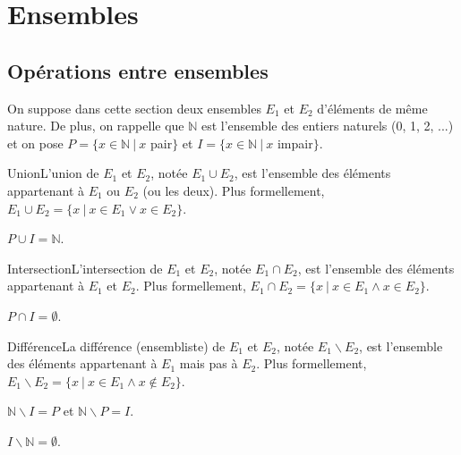\section{Ensembles}

\subsection{Opérations entre ensembles}

On suppose dans cette section deux ensembles $E_1$ et $E_2$ d'éléments de même nature. De plus, on rappelle que $\mathbb{N}$ est l'ensemble des entiers naturels (0, 1, 2, ...) et on pose $P = \{x \in \mathbb{N} ~|~ x$ pair$\}$ et $I = \{x \in \mathbb{N}~|~ x$ impair$\}$.

\begin{definition}{Union}{}L'union de $E_1$ et $E_2$, notée $E_1 \cup E_2$, est l'ensemble des éléments appartenant à $E_1$ ou $E_2$ (ou les deux). Plus formellement, $E_1 \cup E_2 = \{x ~|~ x \in E_1 \vee x \in E_2\}$.
\end{definition}

\begin{example}
$P \cup I = \mathbb{N}$.
\end{example}

\begin{definition}{Intersection}{}L'intersection de $E_1$ et $E_2$, notée $E_1 \cap E_2$, est l'ensemble des éléments appartenant à $E_1$ et $E_2$. Plus formellement, $E_1 \cap E_2 = \{x ~|~ x \in E_1 \wedge x \in E_2\}$.
\end{definition}

\begin{example}
$P \cap I = \emptyset$.
\end{example}


\begin{definition}{Différence}{}La différence (ensembliste) de $E_1$ et $E_2$, notée $E_1 \backslash E_2$, est l'ensemble des éléments appartenant à $E_1$ mais pas à $E_2$. Plus formellement, $E_1 \backslash E_2 = \{x ~|~ x \in E_1 \wedge x \notin E_2\}$.
\end{definition}

\begin{example}
$\mathbb{N} \backslash I = P$ et $\mathbb{N} \backslash P = I$.
\end{example}

\begin{example}
$I \backslash \mathbb{N} = \emptyset$.
\end{example}

